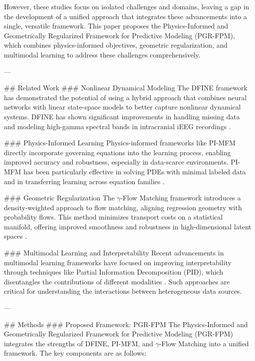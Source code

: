 However, these studies focus on isolated challenges and domains, leaving a gap in the development of a unified approach that integrates these advancements into a single, versatile framework. This paper proposes the Physics-Informed and Geometrically Regularized Framework for Predictive Modeling (PGR-FPM), which combines physics-informed objectives, geometric regularization, and multimodal learning to address these challenges comprehensively.

---

## Related Work
### Nonlinear Dynamical Modeling
The DFINE framework has demonstrated the potential of using a hybrid approach that combines neural networks with linear state-space models to better capture nonlinear dynamical systems. DFINE has shown significant improvements in handling missing data and modeling high-gamma spectral bands in intracranial iEEG recordings \cite{vaziri2025nonlineardynamicalmodelinghuman}.

### Physics-Informed Learning
Physics-informed frameworks like PI-MFM directly incorporate governing equations into the learning process, enabling improved accuracy and robustness, especially in data-scarce environments. PI-MFM has been particularly effective in solving PDEs with minimal labeled data and in transferring learning across equation families \cite{zhu2025pimfmphysicsinformedmultimodalfoundation}.

### Geometric Regularization
The $\gamma$-Flow Matching framework introduces a density-weighted approach to flow matching, aligning regression geometry with probability flows. This method minimizes transport costs on a statistical manifold, offering improved smoothness and robustness in high-dimensional latent spaces \cite{eguchi2025implicitgeometricregularizationflow}.

### Multimodal Learning and Interpretability
Recent advancements in multimodal learning frameworks have focused on improving interpretability through techniques like Partial Information Decomposition (PID), which disentangles the contributions of different modalities \cite{ma2025explainablemultimodalregressioninformation}. Such approaches are critical for understanding the interactions between heterogeneous data sources.

---

## Methods
### Proposed Framework: PGR-FPM
The Physics-Informed and Geometrically Regularized Framework for Predictive Modeling (PGR-FPM) integrates the strengths of DFINE, PI-MFM, and $\gamma$-Flow Matching into a unified framework. The key components are as follows:

